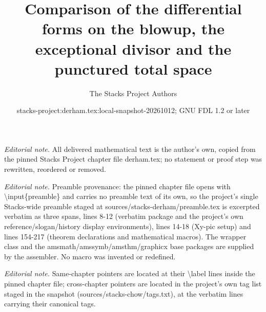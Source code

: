 \documentclass[10pt,a4paper]{amsart}
\title{Comparison of the differential forms on the blowup, the exceptional divisor and the punctured total space}
\author{The Stacks Project Authors}
\date{stacks-project:derham.tex:local-snapshot-20261012; GNU FDL 1.2 or later}
\theoremstyle{plain}
\theoremstyle{definition}
\theoremstyle{remark}
\numberwithin{equation}{subsection}
\begin{document}
\maketitle
\noindent\textit{Editorial note.} All delivered mathematical text is the author's own, copied from the pinned Stacks Project chapter file derham.tex; no statement or proof step was rewritten, reordered or removed.\par\medskip
\noindent\textit{Editorial note.} Preamble provenance: the pinned chapter file opens with \textbackslash{}input\{preamble\} and carries no preamble text of its own, so the project's single Stacks-wide preamble staged at sources/stacks-derham/preamble.tex is excerpted verbatim as three spans, lines 8-12 (verbatim package and the project's own reference/slogan/history display environments), lines 14-18 (Xy-pic setup) and lines 154-217 (theorem declarations and mathematical macros). The wrapper class and the amsmath/amssymb/amsthm/graphicx base packages are supplied by the assembler. No macro was invented or redefined.\par\medskip
\noindent\textit{Editorial note.} Same-chapter pointers are located at their \textbackslash{}label lines inside the pinned chapter file; cross-chapter pointers are located in the project's own tag list staged in the snapshot (sources/stacks-chow/tags.txt), at the verbatim lines carrying their canonical tags.\par\medskip
\end{document}
